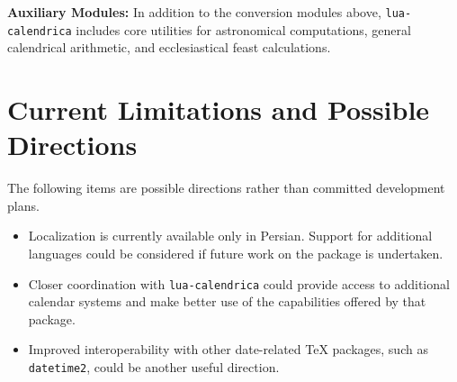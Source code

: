 \documentclass[10pt]{article}
\begin{document}
    
    
    \noindent\textbf{Auxiliary Modules:} In addition to the conversion modules above, \texttt{lua-calendrica} includes core utilities for astronomical computations, general calendrical arithmetic, and ecclesiastical feast calculations.
    
    
    \section{Current Limitations and Possible Directions}
    The following items are possible directions rather than committed development plans.
    
    \begin{itemize}
        \item Localization is currently available only in Persian. Support for additional
        languages could be considered if future work on the package is undertaken.
        
        \item Closer coordination with \texttt{lua-calendrica} could provide access to
        additional calendar systems and make better use of the capabilities offered by
        that package.
        
        \item Improved interoperability with other date-related \TeX{} packages, such as
        \texttt{datetime2}, could be another useful direction.
    \end{itemize}
    
\end{document}
